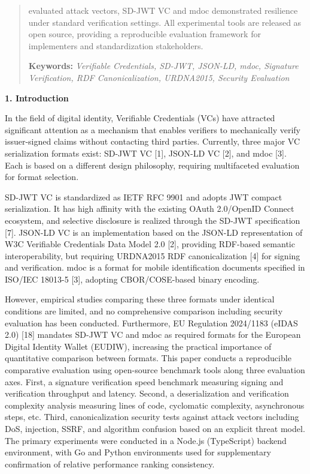 \begin{quote}
evaluated attack vectors, SD-JWT VC and mdoc demonstrated resilience under standard verification settings. All experimental tools are released as open source, providing a reproducible evaluation framework for implementers and standardization stakeholders.

\textbf{Keywords:} \emph{Verifiable Credentials, SD-JWT, JSON-LD, mdoc, Signature Verification, RDF Canonicalization, URDNA2015, Security Evaluation}
\end{quote}

\textbf{1. Introduction}

In the field of digital identity, Verifiable Credentials (VCs) have attracted significant attention as a mechanism that enables verifiers to mechanically verify issuer-signed claims without contacting third parties. Currently, three major VC serialization formats exist: SD-JWT VC {[}1{]}, JSON-LD VC {[}2{]}, and mdoc {[}3{]}. Each is based on a different design philosophy, requiring multifaceted evaluation for format selection.

SD-JWT VC is standardized as IETF RFC 9901 and adopts JWT compact serialization. It has high affinity with the existing OAuth 2.0/OpenID Connect ecosystem, and selective disclosure is realized through the SD-JWT specification {[}7{]}. JSON-LD VC is an implementation based on the JSON-LD representation of W3C Verifiable Credentials Data Model 2.0 {[}2{]}, providing RDF-based semantic interoperability, but requiring URDNA2015 RDF canonicalization {[}4{]} for signing and verification. mdoc is a format for mobile identification documents specified in ISO/IEC 18013-5 {[}3{]}, adopting CBOR/COSE-based binary encoding.

However, empirical studies comparing these three formats under identical conditions are limited, and no comprehensive comparison including security evaluation has been conducted. Furthermore, EU Regulation 2024/1183 (eIDAS 2.0) {[}18{]} mandates SD-JWT VC and mdoc as required formats for the European Digital Identity Wallet (EUDIW), increasing the practical importance of quantitative comparison between formats. This paper conducts a reproducible comparative evaluation using open-source benchmark tools along three evaluation axes. First, a signature verification speed benchmark measuring signing and verification throughput and latency. Second, a deserialization and verification complexity analysis measuring lines of code, cyclomatic complexity, asynchronous steps, etc. Third, canonicalization security tests against attack vectors including DoS, injection, SSRF, and algorithm confusion based on an explicit threat model. The primary experiments were conducted in a Node.js (TypeScript) backend environment, with Go and Python environments used for supplementary confirmation of relative performance ranking consistency.

